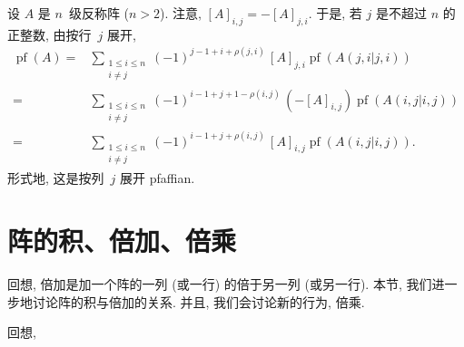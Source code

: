 \documentclass[../libro.tex]{subfiles}
\begin{document}
\begin{example}
    设 \(A\) 是 \(n\)~级反称阵 (\(n > 2\)).
    注意, \([A]_{i,j} = -[A]_{j,i}\).
    于是, 若 \(j\) 是不超过 \(n\) 的正整数,
    由按行~\(j\) 展开,
    \begin{align*}
        \operatorname{pf} {(A)}
        = {} &
        \sum_{\substack{1 \leq i \leq n \\ i \neq j}}
        {
            (-1)^{j-1+i+\rho(j,i)}\, [A]_{j,i}
        \operatorname{pf} {(A({j,i}|{j,i}))}}
        \\
        = {} &
        \sum_{\substack{1 \leq i \leq n \\ i \neq j}}
        {
            (-1)^{i-1+j+1-\rho(i,j)}\, (-[A]_{i,j})
        \operatorname{pf} {(A({i,j}|{i,j}))}}
        \\
        = {} &
        \sum_{\substack{1 \leq i \leq n \\ i \neq j}}
        {
            (-1)^{i-1+j+\rho(i,j)}\, [A]_{i,j}
        \operatorname{pf} {(A({i,j}|{i,j}))}}.
    \end{align*}
    形式地, 这是按列~\(j\) 展开 pfaffian.
\end{example}

\section{阵的积、倍加、倍乘}

回想, 倍加是加一个阵的一列 (或一行) 的倍于另一列 (或另一行).
本节, 我们进一步地讨论阵的积与倍加的关系.
并且, 我们会讨论新的行为, 倍乘.

回想,




\end{document}
